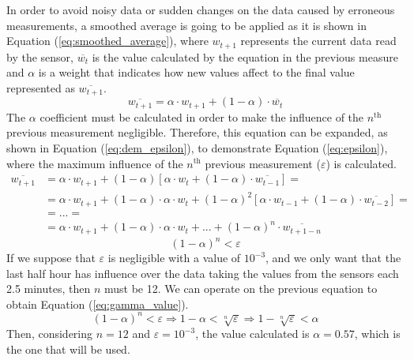 In order to avoid noisy data or sudden changes on the data caused by erroneous measurements, a smoothed average is going to be applied as it is shown in Equation (\ref{eq:smoothed_average}), where ${w}_{t+1}$ represents the current data read by the sensor, $\overline{{w}_{t}}$ is the value calculated by the equation in the previous measure and $\alpha$ is a weight that indicates how new values affect to the final value represented as $\overline{{w}_{t+1}}$.
\begin{equation} \label{eq:smoothed_average}
\overline { { w }_{ t+1 } } =\alpha \cdot { w }_{ t+1 }+(1-\alpha )\cdot \overline { { w }_{ t } } 
\end{equation}
The $\alpha$ coefficient must be calculated in order to make the influence of the $n^\text{th}$ previous measurement negligible. Therefore, this equation can be expanded, as shown in Equation (\ref{eq:dem_epsilon}), to demonstrate Equation (\ref{eq:epsilon}), where the maximum influence of the $n^\text{th}$ previous measurement ($\varepsilon$) is calculated.
\begin{equation} \label{eq:dem_epsilon}
\begin{aligned}
\overline { { w }_{ t+1 } } &=\alpha \cdot { w }_{ t+1 }+(1-\alpha )\left[ \alpha \cdot { w }_{ t }+(1-\alpha )\cdot \overline { { w }_{ t-1 } }  \right] =\\ 
&=\alpha \cdot { w }_{ t+1 }+(1-\alpha )\cdot \alpha \cdot { w }_{ t }+{ (1-\alpha ) }^{ 2 }\left[ \alpha \cdot { w }_{ t-1 }+(1-\alpha )\cdot \overline { { w }_{ t-2 } }  \right] =\\ 
&= ... = \\ 
&=\alpha \cdot { w }_{ t+1 }+(1-\alpha )\cdot \alpha \cdot { w }_{ t }+ ... + { (1-\alpha ) }^{ n }\cdot \overline { { w }_{ t+1-n } }   
\end{aligned}
\end{equation}
\begin{equation} \label{eq:epsilon}
{ (1-\alpha ) }^{ n }<\varepsilon  
\end{equation}
If we suppose that $\varepsilon$ is negligible with a value of ${10}^{-3}$, and we only want that the last half hour has influence over the data taking the values from the sensors each 2.5 minutes, then $n$ must be 12. We can operate on the previous equation to obtain Equation (\ref{eq:gamma_value}).
\begin{equation} \label{eq:gamma_value}
{ (1-\alpha ) }^{ n }<\varepsilon \Rightarrow 1-\alpha <\sqrt [ n ]{ \varepsilon } \Rightarrow 1-\sqrt [ n ]{ \varepsilon }<\alpha
\end{equation}
Then, considering $n=12$ and $\varepsilon={10}^{-3}$, the value calculated is $\alpha=0.57$, which is the one that will be used.

